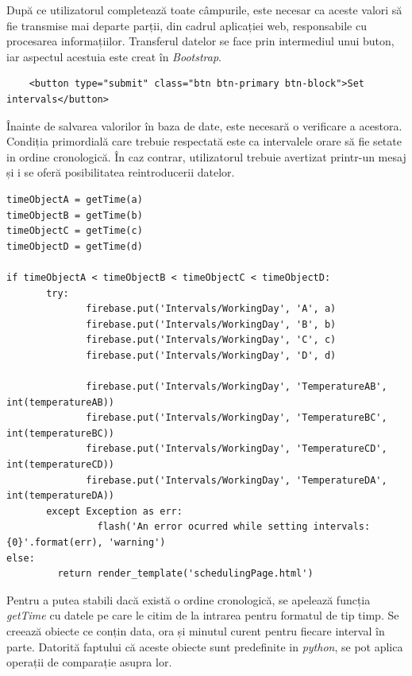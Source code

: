 	După ce utilizatorul completează toate câmpurile, este necesar ca aceste valori să fie transmise mai departe parții, din cadrul aplicației web, responsabile cu procesarea informațiilor. Transferul datelor se face prin intermediul unui buton, iar aspectul acestuia este creat în \textit{Bootstrap}.
\vspace{1em}
\begin{lstlisting}
	<button type="submit" class="btn btn-primary btn-block">Set intervals</button>
\end{lstlisting}
\vspace{2em} 

	Înainte de salvarea valorilor în baza de date, este necesară o verificare a acestora. Condiția primordială care trebuie respectată este ca intervalele orare să fie setate in ordine cronologică. În caz contrar, utilizatorul trebuie avertizat printr-un mesaj și i se oferă posibilitatea reintroducerii datelor.

\vspace{1em}
\begin{lstlisting}
timeObjectA = getTime(a)
timeObjectB = getTime(b)
timeObjectC = getTime(c)
timeObjectD = getTime(d)

if timeObjectA < timeObjectB < timeObjectC < timeObjectD:
       try:
              firebase.put('Intervals/WorkingDay', 'A', a)
              firebase.put('Intervals/WorkingDay', 'B', b)
              firebase.put('Intervals/WorkingDay', 'C', c)
              firebase.put('Intervals/WorkingDay', 'D', d)

              firebase.put('Intervals/WorkingDay', 'TemperatureAB', int(temperatureAB))
              firebase.put('Intervals/WorkingDay', 'TemperatureBC', int(temperatureBC))
              firebase.put('Intervals/WorkingDay', 'TemperatureCD', int(temperatureCD))
              firebase.put('Intervals/WorkingDay', 'TemperatureDA', int(temperatureDA))
       except Exception as err:
                flash('An error ocurred while setting intervals: {0}'.format(err), 'warning')
else:
    	 return render_template('schedulingPage.html')
\end{lstlisting}
\vspace{2em} 

	Pentru a putea stabili dacă există o ordine cronologică, se apelează funcția \textit{getTime} cu datele pe care le citim de la intrarea pentru formatul de tip timp. Se creează obiecte ce conțin data, ora și minutul curent pentru fiecare interval în parte. Datorită faptului că aceste obiecte sunt predefinite in \textit{python}, se pot aplica operații de comparație asupra lor. 


